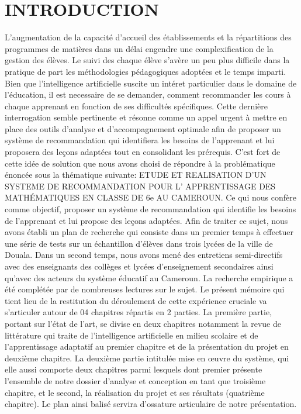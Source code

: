 \chapter*{INTRODUCTION}

	L’augmentation de la capacité d’accueil des établissements et la répartitions des programmes de matières dans un délai engendre une complexification de la gestion des élèves. Le suivi des chaque élève s’avère un peu plus difficile dans la pratique de part les méthodologies pédagogiques adoptées et le temps imparti. Bien que l’intelligence artificielle suscite un intéret particulier dans le domaine de l’éducation, il est necessaire de se demander, comment recommander les cours à chaque apprenant en fonction de ses difficultés spécifiques. Cette dernière interrogation semble pertinente et résonne comme un appel urgent à mettre en place des outils d’analyse et d’accompagnement optimale afin de proposer un système de recommandation qui identifiera les besoins de l’apprenant et lui proposera des leçons adaptées tout en consolidant les prérequis. C’est fort de cette idée de solution que nous avons choisi de répondre à la problématique énoncée sous la thématique suivante: ETUDE ET REALISATION D’UN SYSTEME DE RECOMMANDATION POUR L’ APPRENTISSAGE DES MATHÉMATIQUES EN CLASSE DE 6e AU CAMEROUN. Ce qui nous confère comme objectif, proposer un système de recommandation qui identifie les besoins de l’apprenant et lui propose des leçons adaptées. Afin de traiter ce sujet, nous avons établi un plan de recherche qui consiste dans un premier temps à effectuer une série de tests sur un échantillon d’élèves dans trois lycées de la ville de Douala. Dans un second temps, nous avons mené des entretiens semi-directifs avec des enseignants des collèges et lycées d’enseignement secondaires ainsi qu’avec des acteurs du système éducatif au Cameroun. La recherche empirique a été complétée par de nombreuses lectures sur le sujet.
Le présent mémoire qui tient lieu de la restitution du déroulement de cette expérience cruciale va s’articuler autour de 04 chapitres répartis en 2 parties. La première partie, portant sur l’état de l’art, se divise en deux chapitres notamment la revue de littérature qui traite de l’intelligence artificielle en milieu scolaire et de l’apprentissage adaptatif  au premier chapitre et de la présentation du projet en deuxième chapitre. La deuxième partie intitulée mise en œuvre du système, qui elle aussi comporte deux chapitres parmi lesquels dont premier présente l’ensemble de notre dossier d’analyse et conception en tant que troisième chapitre, et le second, la réalisation du projet et ses résultats (quatrième chapitre). Le plan ainsi balisé servira d’ossature articulaire de notre présentation. 
